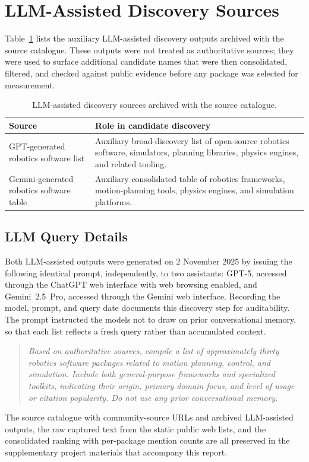 \section*{LLM-Assisted Discovery Sources}

Table~\ref{tab:llm-mention-sources} lists the auxiliary LLM-assisted discovery outputs archived with the source catalogue. These outputs were not treated as authoritative sources; they were used to surface additional candidate names that were then consolidated, filtered, and checked against public evidence before any package was selected for measurement.

\begin{table}[htbp]
\centering
\caption{LLM-assisted discovery sources archived with the source catalogue.}
\label{tab:llm-mention-sources}
\small
\singlespacing
\begin{tabular}{@{}p{4.6cm}p{8.2cm}@{}}
\toprule
\textbf{Source} & \textbf{Role in candidate discovery} \\
\midrule
GPT-generated robotics software list & Auxiliary broad-discovery list of open-source robotics software, simulators, planning libraries, physics engines, and related tooling. \\
Gemini-generated robotics software table & Auxiliary consolidated table of robotics frameworks, motion-planning tools, physics engines, and simulation platforms. \\
\bottomrule
\end{tabular}
\end{table}

\subsection*{LLM Query Details}

Both LLM-assisted outputs were generated on 2 November 2025 by issuing the following identical prompt, independently, to two assistants: GPT-5, accessed through the ChatGPT web interface with web browsing enabled, and Gemini~2.5~Pro, accessed through the Gemini web interface. Recording the model, prompt, and query date documents this discovery step for auditability. The prompt instructed the models not to draw on prior conversational memory, so that each list reflects a fresh query rather than accumulated context.

\begin{quote}
\itshape
Based on authoritative sources, compile a list of approximately thirty robotics software packages related to motion planning, control, and simulation. Include both general-purpose frameworks and specialized toolkits, indicating their origin, primary domain focus, and level of usage or citation popularity. Do not use any prior conversational memory.
\end{quote}

The source catalogue with community-source URLs and archived LLM-assisted outputs, the raw captured text from the static public web lists, and the consolidated ranking with per-package mention counts are all preserved in the supplementary project materials that accompany this report.
